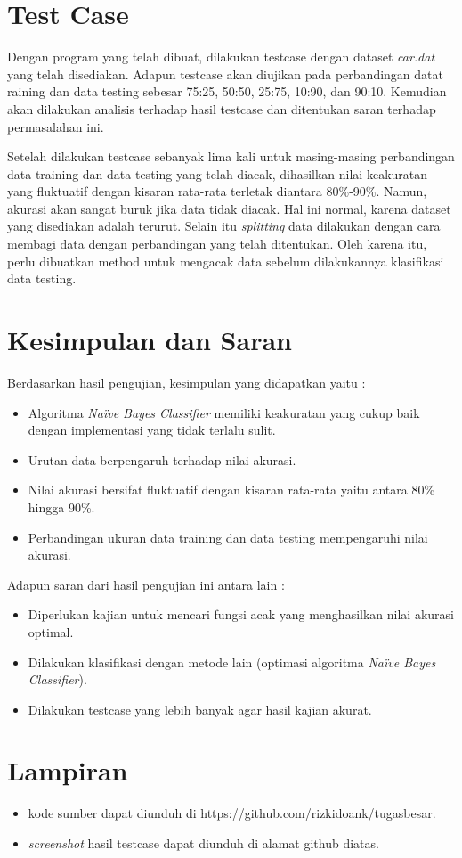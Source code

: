 \documentclass[11pt,a4paper]{report}
\begin{document}
	\section*{Test Case}
	Dengan program yang telah dibuat, dilakukan testcase dengan dataset \emph{car.dat} yang telah disediakan. Adapun testcase akan diujikan pada perbandingan datat raining dan data testing sebesar 75:25, 50:50, 25:75, 10:90, dan 90:10. Kemudian akan dilakukan analisis terhadap hasil testcase dan ditentukan saran terhadap permasalahan ini.
	
	Setelah dilakukan testcase sebanyak lima kali untuk masing-masing perbandingan data training dan data testing yang telah diacak, dihasilkan nilai keakuratan yang fluktuatif dengan kisaran rata-rata terletak diantara 80\%-90\%. Namun, akurasi akan sangat buruk jika data tidak diacak. Hal ini normal, karena dataset yang disediakan adalah terurut. Selain itu \emph{splitting} data dilakukan dengan cara membagi data dengan perbandingan yang telah ditentukan. Oleh karena itu, perlu dibuatkan method untuk mengacak data sebelum dilakukannya klasifikasi data testing.
	\section*{Kesimpulan dan Saran}
	Berdasarkan hasil pengujian, kesimpulan yang didapatkan yaitu :
	\begin{itemize}
		\item Algoritma \emph{Na\"{i}ve Bayes Classifier} memiliki keakuratan yang cukup baik dengan implementasi yang tidak terlalu sulit.
		\item Urutan data berpengaruh terhadap nilai akurasi.
		\item Nilai akurasi bersifat fluktuatif dengan kisaran rata-rata yaitu antara 80\% hingga 90\%.
		\item Perbandingan ukuran data training dan data testing mempengaruhi nilai akurasi.
	\end{itemize}
	Adapun saran dari hasil pengujian ini antara lain :
	\begin{itemize}
		\item Diperlukan kajian untuk mencari fungsi acak yang menghasilkan nilai akurasi optimal.
		\item Dilakukan klasifikasi dengan metode lain (optimasi algoritma \emph{Na\"{i}ve Bayes Classifier}).
		\item Dilakukan testcase yang lebih banyak agar hasil kajian akurat.
	\end{itemize}
	\section*{Lampiran}
	\begin{itemize}
		\item kode sumber dapat diunduh di https://github.com/rizkidoank/tugasbesar.
		\item \emph{screenshot} hasil testcase dapat diunduh di alamat github diatas.
	\end{itemize}
	\nocite{*}
	
	
\end{document}
